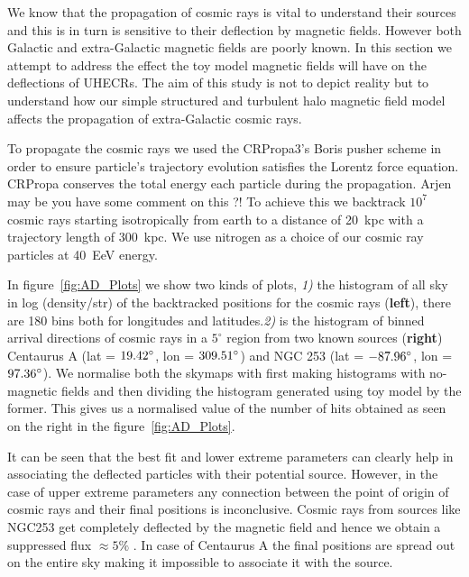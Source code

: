 \documentclass[12pt, a4 paper]{article}
\newcommand{\Vasu}[1]{{\color{purple}#1}}
\begin{document}
We know that the propagation of cosmic rays is vital to understand their sources and this is in turn is sensitive to their deflection by magnetic fields. However both Galactic and extra-Galactic magnetic fields are poorly known. In this section we attempt to address the effect the toy model magnetic fields will have on the deflections of UHECRs. The aim of this study is not to depict reality but to understand how our simple structured and turbulent halo magnetic field model affects the propagation of extra-Galactic cosmic rays. 

To propagate the cosmic rays we used the CRPropa3's \cite{CRPropa3_2016} Boris pusher scheme in order to ensure particle's trajectory evolution satisfies the Lorentz force equation. CRPropa conserves the total energy each particle during the propagation.  \Vasu{Arjen may be you have some comment on this ?!}
To achieve this we backtrack $10^7$ cosmic rays starting isotropically from earth to a distance of 20~kpc with a trajectory length of 300~kpc. We use nitrogen as a choice of our cosmic ray particles at 40~EeV energy. 


In figure~\ref{fig:AD_Plots} we show two kinds of plots, \textit{1)} the histogram of all sky in log (density/str) of the backtracked positions for the cosmic rays (\textbf{left}), there are 180 bins both for longitudes and latitudes.\textit{2)} is the histogram of binned arrival directions of cosmic rays in a $5^{\circ}$ region from two known sources (\textbf{right}) Centaurus A (lat = $\rm 19.42^{\circ}$, lon = $\rm 309.51^{\circ}$) and NGC 253 (lat = $\rm -87.96^{\circ}$, lon = $\rm 97.36^{\circ}$).  We normalise both the skymaps with first making histograms with no-magnetic fields and then dividing the histogram generated using toy model by the former. This gives us a normalised value of the number of hits obtained as seen on the right in the figure~\ref{fig:AD_Plots}.

It can be seen that the best fit and lower extreme parameters can clearly help in associating the deflected particles with their potential source. However, in the case of upper extreme parameters any connection between the point of origin of cosmic rays and their final positions is inconclusive. Cosmic rays from  sources like NGC253 get completely deflected by the magnetic field and hence we obtain a suppressed flux $\approx 5\%$ . In case of Centaurus A the final positions are spread out on the entire sky making it impossible to associate it with the source.
\end{document}
